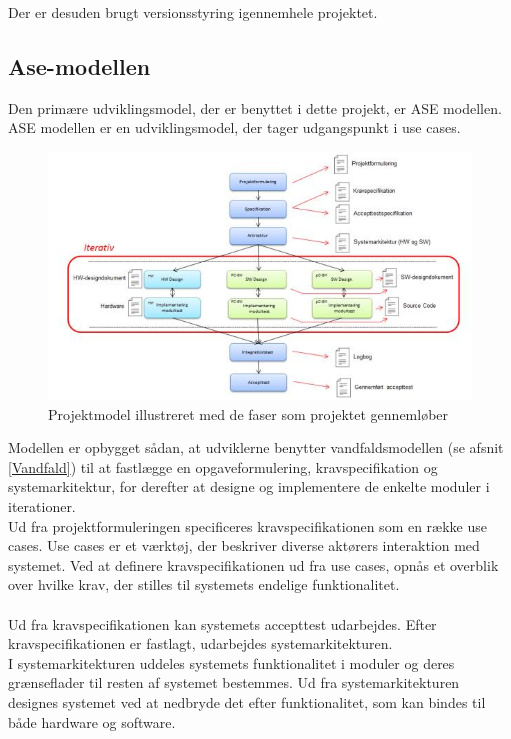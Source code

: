 Der er desuden brugt versionsstyring igennemhele projektet.\\ 
\subsection{Ase-modellen}
Den primære udviklingsmodel, der er benyttet i dette projekt, er ASE modellen. ASE modellen er en udviklingsmodel, der tager udgangspunkt i use cases. 
\begin{figure}[H]
	\centering
	\includegraphics[width=1\textwidth]{Figurer/Metode/ASEmodellen}
	\caption{Projektmodel illustreret med de faser som projektet gennemløber\protect\footnotemark}
	\label{ASEmodel}
\end{figure}


Modellen er opbygget sådan, at udviklerne benytter vandfaldsmodellen (se afsnit \ref{Vandfald}) til at fastlægge en opgaveformulering, kravspecifikation og systemarkitektur, for derefter at designe og implementere de enkelte moduler i iterationer. \\ Ud fra projektformuleringen specificeres kravspecifikationen som en række use cases. Use cases er et værktøj, der beskriver diverse aktørers interaktion med systemet. Ved at definere kravspecifikationen ud fra use cases, opnås et overblik over hvilke krav, der stilles til systemets endelige funktionalitet.\\ \\ Ud fra kravspecifikationen kan systemets accepttest udarbejdes. Efter kravspecifikationen er fastlagt, udarbejdes systemarkitekturen.\\ I systemarkitekturen uddeles systemets funktionalitet i moduler og deres grænseflader til resten af systemet bestemmes. Ud fra systemarkitekturen designes systemet ved at nedbryde det efter funktionalitet, som kan bindes til både hardware og software.
